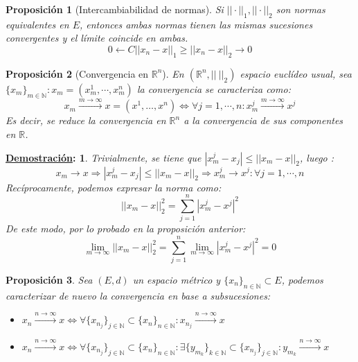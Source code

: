 \documentclass[10pt,a4paper,openright]{book}
\theoremstyle{break}
\newtheorem*{prop}{Proposición}
\newtheorem*{demo}{\underline{Demostración}:}
\begin{document}
\begin{prop}[Intercambiabilidad de normas]
Si $||\cdot||_1, ||\cdot||_2$ son normas equivalentes en $E$, entonces ambas normas tienen las mismas sucesiones convergentes y el límite coincide en ambas.
$$0 \leftarrow C||x_n - x||_1 \geq ||x_n - x||_2 \to 0$$
\end{prop}

\begin{prop}[Convergencia en $\mathbb{R}^n$]
En $(\mathbb{R}^n, || \ ||_2)$ espacio euclídeo usual, sea $\{x_m\}_{m \in  \mathbb{N}}: x_m = (x_m^1, \cdots, x_m^n)$ la convergencia se caracteriza como:
$$x_m \xrightarrow{m \rightarrow \infty} x = (x^1, \ldots, x^n) \Leftrightarrow \forall j = 1, \cdots, n: x_m^j \xrightarrow{m\rightarrow\infty} x^j$$
Es decir, se reduce la convergencia en $\mathbb{R}^n$ a la convergencia de sus componentes en $\mathbb{R}$.
\end{prop}

\begin{demo}
Trivialmente, se tiene que $|x_m^j - x_j| \leq ||x_m - x||_2$, luego :
$$x_m \rightarrow x \Rightarrow |x_m^j - x_j| \leq ||x_m - x||_2 \Rightarrow x_m^j \rightarrow x^j : \forall j = 1, \cdots, n$$
Recíprocamente, podemos expresar la norma como:
$$||x_m - x||_2^2 = \sum_{j=1}^{n} |x_m^j - x^j|^2$$
De este modo, por lo probado en la proposición anterior:
$$\lim_{m \rightarrow \infty} ||x_m - x||_2^2 = \sum_{j=1}^{n} \lim_{m \rightarrow \infty} |x_m^j - x^j|^2 = 0$$
\end{demo}

\begin{prop}
Sea $(E,d)$ un espacio métrico y $\{x_n\}_{n\in \mathbb{N}} \subset E$, podemos caracterizar de nuevo la convergencia en base a subsucesiones:
\begin{itemize}
\item $x_n \xrightarrow{n\rightarrow\infty} x \Leftrightarrow \forall\{x_{n_j}\}_{j \in \mathbb{N}} \subset \{x_n\}_{n\in \mathbb{N}} : x_{n_j} \xrightarrow{n\rightarrow\infty} x$ 

\item $x_n \xrightarrow{n\rightarrow\infty} x \Leftrightarrow \forall\{x_{n_j}\}_{j \in \mathbb{N}} \subset \{x_n\}_{n\in \mathbb{N}} : \exists \{y_{m_k}\}_{k \in \mathbb{N}} \subset \{x_{n_j}\}_{j \in \mathbb{N}} : y_{m_k} \xrightarrow{n\rightarrow \infty} x$
\end{itemize}
\end{prop}
\end{document}
